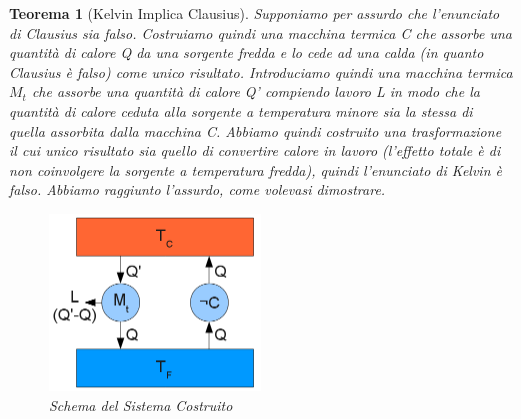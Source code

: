 \documentclass{article}
\newtheorem{thm}{Teorema}[section]
\begin{document}
\begin{thm}[Kelvin Implica Clausius]
Supponiamo per assurdo che l'enunciato di Clausius sia falso. Costruiamo quindi una macchina termica C che assorbe una quantità di calore Q da una sorgente fredda e lo cede ad una calda (in quanto Clausius è falso) come unico risultato. Introduciamo quindi una macchina termica $M_t$ che assorbe una quantità di calore Q' compiendo lavoro L in modo che la quantità di calore ceduta alla sorgente a temperatura minore sia la stessa di quella assorbita dalla macchina C. Abbiamo quindi costruito una trasformazione il cui unico risultato sia quello di convertire calore in lavoro (l'effetto totale è di non coinvolgere la sorgente a temperatura fredda), quindi l'enunciato di Kelvin è falso. Abbiamo raggiunto l'assurdo, come volevasi dimostrare. 
\begin{figure}[H]
    \centering
    \includegraphics[width=0.5\textwidth]{Clausius_dimostrazione_assurdo.png}
    \caption{Schema del Sistema Costruito}
    \label{KelvinClausius}
\end{figure}
\end{thm}
\end{document}
